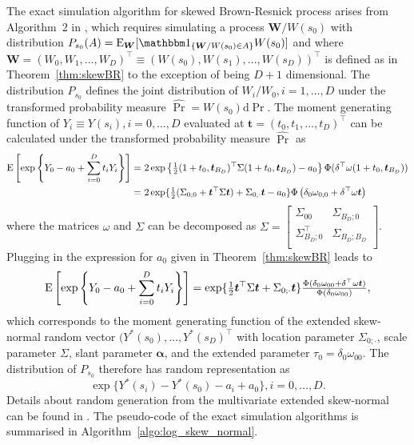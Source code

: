 \documentclass[12pt]{article}
\begin{document}
The exact simulation algorithm for skewed Brown-Resnick process arises from Algorithm~2 in \cite{Dombry.Engelke.Oesting:2016}, which requires simulating a process $\bm W/W(s_0)$ with distribution $P_{s_0}(A) = \E_{\bm W}[\mathbbm 1_{\{\bm W/W(s_0)\in A\}}W(s_0)]$ and where $\bm W = (W_0, W_1, \ldots, W_D)^\top \equiv \left( W(s_0), W(s_1), \ldots, W(s_D)\right)^\top$  is  defined as in Theorem~\ref{thm:skewBR} to the exception of being $D+1$ dimensional.
The distribution $P_{s_0}$ defines the joint distribution of $W_i/W_0, i=1,\dots,D$ under the transformed probability measure $\hat \Pr = W(s_0)\text{d}\Pr$. The moment generating function of $Y_i \equiv Y(s_i),i=0,\dots,D$ evaluated at $\bm t = (t_0, t_1, \ldots, t_D)^\top$ can be calculated under the transformed probability measure $\hat\Pr$ as
\begin{align*}
	{\rm E}\left[\exp\left\{Y_0-a_0 + \sum_{i=0}^D t_i Y_i\right\}\right]
	=&\ 2\exp\left\{{\textstyle{1\over2}}(1+t_0,\bm t_{B_D})^\top\Sigma(1+t_0,\bm t_{B_D})-a_0 \right\} \Phi(\delta^\top\omega(1+t_0,\bm t_{B_D}))\\
	 =&\ 2\exp\{{\textstyle{1\over2}}(\Sigma_{0;0} + \bm t^\top\Sigma \bm t) + \Sigma_{0;\cdot} \bm t - a_0\}\Phi\left(\delta_0\omega_{0;0} + \delta^\top\omega \bm t\right) 
\end{align*}        
where the matrices $\omega$ and $\Sigma$ can be decomposed as $\Sigma = \begin{bmatrix}
	\Sigma_{00} & \Sigma_{B_D;0} \\
	\Sigma_{B_D;0}^\top & \Sigma_{B_D;B_D} \\
\end{bmatrix}$. 
%
Plugging in the expression for $a_0$ given in Theorem~\ref{thm:skewBR} leads to 
%
\begin{equation*}
{\rm E}\left[\exp\left\{Y_0-a_0 + \sum_{i=0}^D t_i Y_i\right\}\right] = \exp\{{\textstyle{1\over2}} \bm t^\top\Sigma \bm t + \Sigma_{0;\cdot} \bm t \} 
{\textstyle{\Phi(\delta_0\omega_{00} + \delta^\top\omega \bm t)\over\Phi(\delta_0\omega_{00})}}, 
\end{equation*}
%
which corresponds to the moment generating function of the extended skew-normal random vector $(Y^*(s_0),\ldots,Y^*(s_D)^\top$ with location parameter $\Sigma_{0;\cdot}$, scale parameter $\Sigma$, slant parameter $\bm\alpha$, and the extended parameter $\tau_0 = \delta_0\omega_{00}$. The distribution of $P_{s_0}$ therefore has random representation as 
%
$$\exp\{Y^*(s_i)-Y^*(s_0)-a_i + a_0\}, i=0,\dots,D.$$
%
Details about random generation from the multivariate extended skew-normal can be found in \citet[Chapter 5.3.3]{Azzalini:2013}. The pseudo-code of the exact simulation algorithms is summarised in Algorithm~\ref{algo:log_skew_normal}.   
\end{document}
